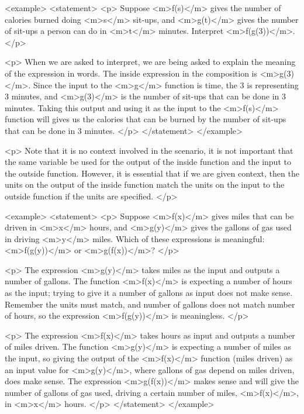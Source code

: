         <example>
            <statement>
                <p>
                    Suppose <m>f(s)</m> gives the number of calories burned doing <m>s</m> sit-ups, and <m>g(t)</m> gives the number of sit-ups a person can do in <m>t</m> minutes.
                    Interpret <m>f(g(3))</m>.
                </p>

                <p>
                    When we are asked to interpret, we are being asked to explain the meaning of the expression in words.
                    The inside expression in the composition is <m>g(3)</m>.
                    Since the input to the <m>g</m> function is time, the 3 is representing 3 minutes, and <m>g(3)</m> is the number of sit-ups that can be done in 3 minutes.
                    Taking this output and using it as the input to the <m>f(s)</m> function will gives us the calories that can be burned by the number of sit-ups that can be done in 3 minutes.
                </p>
            </statement>
        </example>

        <p>
            Note that it is no context involved in the scenario, it is not important that the same variable be used for the output of the inside function and the input to the outside function.
            However, it is essential that if we are given context, then the units on the output of the inside function match the units on the input to the outside function if the units are specified.
        </p>

        <example>
            <statement>
                <p>
                    Suppose <m>f(x)</m> gives miles that can be driven in <m>x</m> hours, and <m>g(y)</m> gives the gallons of gas used in driving <m>y</m> miles.
                    Which of these expressions is meaningful: <m>f(g(y))</m> or <m>g(f(x))</m>?
                </p>

                <p>
                    The expression <m>g(y)</m> takes miles as the input and outputs a number of gallons.
                    The function <m>f(x)</m> is expecting a number of hours as the input; trying to give it a number of gallons as input does not make sense.
                    Remember the units must match, and number of gallons does not match number of hours, so the expression <m>f(g(y))</m> is meaningless.
                </p>

                <p>
                    The expression <m>f(x)</m> takes hours as input and outputs a number of miles driven.
                    The function <m>g(y)</m> is expecting a number of miles as the input, so giving the output of the <m>f(x)</m> function (miles driven) as an input value for <m>g(y)</m>, where gallons of gas depend on miles driven, does make sense.
                    The expression <m>g(f(x))</m> makes sense and will give the number of gallons of gas used, driving a certain number of miles, <m>f(x)</m>, in <m>x</m> hours.
                </p>
            </statement>
        </example>

